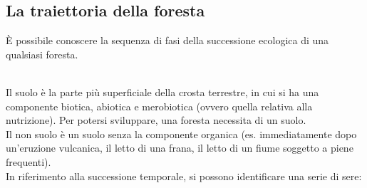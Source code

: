 \subsection{La traiettoria della foresta}
È possibile conoscere la sequenza di fasi della successione ecologica di una qualsiasi foresta.\\
\\
Il suolo è la parte più superficiale della crosta terrestre, in cui si ha una componente biotica, abiotica e merobiotica (ovvero quella relativa alla nutrizione). Per potersi sviluppare, una foresta necessita di un suolo.\\
Il non suolo è un suolo senza la componente organica (es. immediatamente dopo un'eruzione vulcanica, il letto di una frana, il letto di un fiume soggetto a piene frequenti).\\
In riferimento alla successione temporale, si possono identificare una serie di sere:

